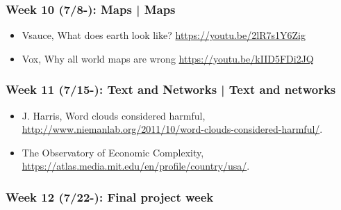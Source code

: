 \documentclass[11pt,article,oneside]{memoir} %
\begin{document}
\subsubsection{Week 10 (7/8-): Maps | Maps }%

\begin{itemize}\itemsep0em 
\item Vsauce, What does earth look like? \url{https://youtu.be/2lR7s1Y6Zig}
\item Vox, Why all world maps are wrong \url{https://youtu.be/kIID5FDi2JQ}
\end{itemize}	
\subsubsection{Week 11 (7/15-): Text and Networks | Text and networks} %

\begin{itemize}\itemsep0em 
\item J. Harris, Word clouds considered harmful, \url{http://www.niemanlab.org/2011/10/word-clouds-considered-harmful/}. 
\item The Observatory of Economic Complexity, \url{https://atlas.media.mit.edu/en/profile/country/usa/}.
\end{itemize}	
\subsubsection{Week 12 (7/22-): Final project week}%


\end{document}
